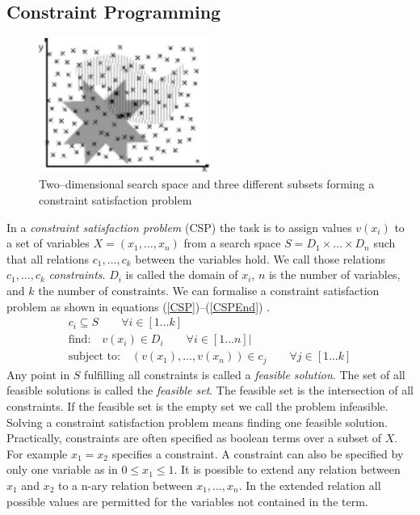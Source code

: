 \subsection{Constraint Programming}
\begin{figure}
\begin{center}
\includegraphics[width=0.5\textwidth]{./pics/SetIntersection.pdf}
\end{center}
\caption{Two--dimensional search space and three different subsets forming a constraint satisfaction problem}
\label{fig:CSPExample}
\end{figure}
In a \emph{constraint satisfaction problem} (CSP) the task is to assign values $v(x_i)$ to a set of variables $X = (x_1, \dots , x_n)$ from a search space $S=D_1\times \dots \times D_n$ such that all relations $c_1,\dots,c_k$ between the variables hold. We call those relations $c_1,\dots,c_k$ \emph{constraints}. $D_i$ is called the domain of $x_i$, $n$ is the number of variables, and $k$ the number of constraints. We can formalise a constraint satisfaction problem as shown in equations (\ref{CSP})--(\ref{CSPEnd}) \cite{Eiben97constraintsatisfaction}\cite{wiki:CSP}.
\begin{eqnarray} 
\label{CSP}
c_i \subseteq S \qquad\forall i \in \left[ 1 \dots k \right]\\
\text{find:} \quad v(x_i) \in D_i \qquad\forall i \in \left[ 1 \dots n \right]| \\
\label{CSPEnd}
\text{subject to:} \quad (v(x_1),\dots , v(x_n)) \in c_j\qquad\forall j \in \left[1 \dots k\right]
\end{eqnarray} 
Any point in $S$ fulfilling all constraints is called a \emph{feasible solution}. The set of all feasible solutions is called the \emph{feasible set}. The feasible set is the intersection of all constraints. If the feasible set is the empty set we call the problem infeasible. Solving a constraint satisfaction problem means finding one feasible solution.\\
Practically, constraints are often specified as boolean terms over a subset of $X$. For example $x_1=x_2$ specifies a constraint. A constraint can also be specified by only one variable as in $0\leq x_1 \leq 1$. It is possible to extend any relation between $x_1$ and $x_2$ to a n-ary relation between $x_1,\dots,x_n$. In the extended relation all possible values are permitted for the variables not contained in the term.\\
